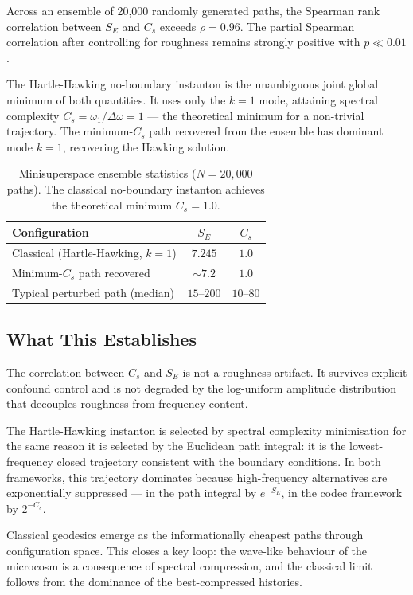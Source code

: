 Across an ensemble of 20,000 randomly generated paths, the Spearman
rank correlation between $S_E$ and $C_s$ exceeds $\rho = 0.96$. The
partial Spearman correlation after controlling for roughness remains
strongly positive with $p \ll 0.01$.

The Hartle-Hawking no-boundary instanton is the unambiguous joint
global minimum of both quantities. It uses only the $k = 1$ mode,
attaining spectral complexity $C_s = \omega_1/\Delta\omega = 1$ ---
the theoretical minimum for a non-trivial trajectory. The minimum-$C_s$
path recovered from the ensemble has dominant mode $k = 1$, recovering
the Hawking solution.

\begin{table}[h]
\centering
\begin{tabular}{lcc}
\toprule
Configuration & $S_E$ & $C_s$ \\
\midrule
Classical (Hartle-Hawking, $k=1$) & $7.245$ & $1.0$ \\
Minimum-$C_s$ path recovered & ${\sim}7.2$ & $1.0$ \\
Typical perturbed path (median) & $15$--$200$ & $10$--$80$ \\
\bottomrule
\end{tabular}
\caption{Minisuperspace ensemble statistics ($N = 20{,}000$ paths). The
classical no-boundary instanton achieves the theoretical minimum
$C_s = 1.0$.}
\end{table}

\subsection{What This Establishes}

The correlation between $C_s$ and $S_E$ is not a roughness artifact.
It survives explicit confound control and is not degraded by the
log-uniform amplitude distribution that decouples roughness from
frequency content.

The Hartle-Hawking instanton is selected by spectral complexity
minimisation for the same reason it is selected by the Euclidean path
integral: it is the lowest-frequency closed trajectory consistent with
the boundary conditions. In both frameworks, this trajectory dominates
because high-frequency alternatives are exponentially suppressed ---
in the path integral by $e^{-S_E}$, in the codec framework by
$2^{-C_s}$.

Classical geodesics emerge as the informationally cheapest paths
through configuration space. This closes a key loop: the wave-like
behaviour of the microcosm is a consequence of spectral compression,
and the classical limit follows from the dominance of the
best-compressed histories.

